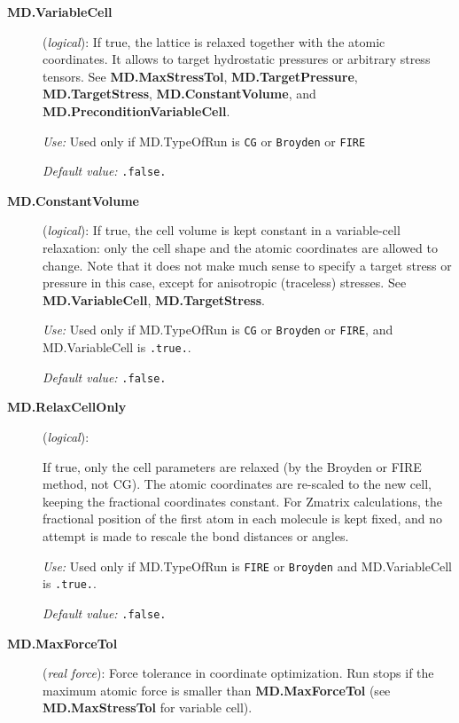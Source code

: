 \documentclass[11pt]{article}
\begin{document}
\begin{description}
\item[{\bf MD.VariableCell}] ({\it logical}):
    If true, the lattice is relaxed together with the
  atomic coordinates. It allows to target hydrostatic pressures or
  arbitrary stress tensors.  See {\bf MD.MaxStressTol}, {\bf
    MD.TargetPressure}, {\bf MD.TargetStress}, {\bf
    MD.ConstantVolume}, and {\bf MD.PreconditionVariableCell}.

{\it Use:} Used only if MD.TypeOfRun is {\tt CG} or {\tt Broyden} or
{\tt FIRE}

{\it Default value:} {\tt .false.}

\item[{\bf MD.ConstantVolume}] ({\it logical}):
   If true, the cell volume is
  kept constant in a variable-cell relaxation: only the cell shape and
  the atomic coordinates are allowed to change.  Note that it does not
  make much sense to specify a target stress or pressure in this case,
  except for anisotropic (traceless) stresses.  See {\bf
    MD.VariableCell}, {\bf MD.TargetStress}.

{\it Use:} Used only if MD.TypeOfRun is {\tt CG} or {\tt Broyden} or
{\tt FIRE},  and  MD.VariableCell is {\tt .true.}.

{\it Default value:} {\tt .false.}

\item[{\bf MD.RelaxCellOnly}] ({\it logical}):
 

If true, only the cell parameters are relaxed (by the Broyden or FIRE
method, not CG).  The atomic coordinates are re-scaled to the new
cell, keeping the fractional coordinates constant. For Zmatrix
calculations, the fractional position of the first atom in each
molecule is kept fixed, and no attempt is made to rescale the bond
distances or angles.

{\it Use:} Used only if MD.TypeOfRun is {\tt FIRE} or {\tt Broyden}  and
 MD.VariableCell is {\tt .true.}.

{\it Default value:} {\tt .false.}

\item[{\bf MD.MaxForceTol}] ({\it real force}):
Force tolerance in coordinate optimization.
Run stops if the maximum atomic force is
smaller than {\bf MD.MaxForceTol} (see {\bf MD.MaxStressTol}
for variable cell).


\end{description}
\end{document}
